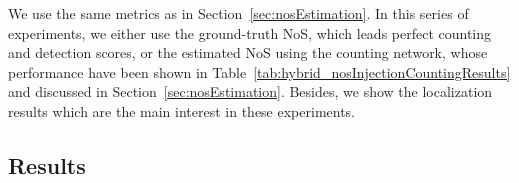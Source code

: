 We use the same metrics as in Section~\ref{sec:nosEstimation}. In this series of experiments, we either use the ground-truth NoS, which leads perfect counting and detection scores, or the estimated NoS using the counting network, whose performance have been shown in Table~\ref{tab:hybrid_nosInjectionCountingResults} and discussed in Section~\ref{sec:nosEstimation}. Besides, we show the localization results which are the main interest in these experiments.

\subsection{Results}
\label{ss:hybridNosInjectionResults}

\begin{table}[t]
\centering
\end{table}
